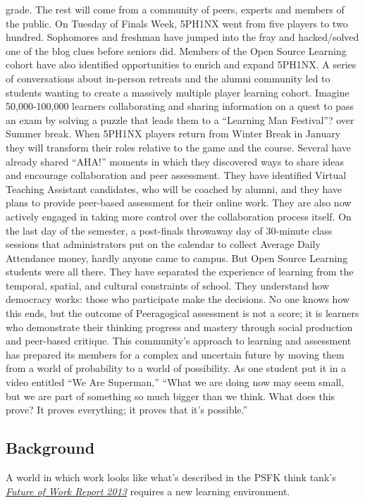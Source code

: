 grade. The rest will come from a community of peers, experts and members
of the public. On Tuesday of Finals Week, 5PH1NX went from five players
to two hundred. Sophomores and freshman have jumped into the fray and
hacked/solved one of the blog clues before seniors did. Members of the
Open Source Learning cohort have also identified opportunities to enrich
and expand 5PH1NX. A series of conversations about in-person retreats
and the alumni community led to students wanting to create a massively
multiple player learning cohort. Imagine 50,000-100,000 learners
collaborating and sharing information on a quest to pass an exam by
solving a puzzle that leads them to a ``Learning Man Festival''? over
Summer break. When 5PH1NX players return from Winter Break in January
they will transform their roles relative to the game and the course.
Several have already shared ``AHA!'' moments in which they discovered
ways to share ideas and encourage collaboration and peer assessment.
They have identified Virtual Teaching Assistant candidates, who will be
coached by alumni, and they have plans to provide peer-based assessment
for their online work. They are also now actively engaged in taking more
control over the collaboration process itself. On the last day of the
semester, a post-finals throwaway day of 30-minute class sessions that
administrators put on the calendar to collect Average Daily Attendance
money, hardly anyone came to campus. But Open Source Learning students
were all there. They have separated the experience of learning from the
temporal, spatial, and cultural constraints of school. They understand
how democracy works: those who participate make the decisions. No one
knows how this ends, but the outcome of Peeragogical assessment is not a
score; it is learners who demonstrate their thinking progress and
mastery through social production and peer-based critique. This
community's approach to learning and assessment has prepared its members
for a complex and uncertain future by moving them from a world of
probability to a world of possibility. As one student put it in a video
entitled ``We Are Superman,'' ``What we are doing now may seem small,
but we are part of something so much bigger than we think. What does
this prove? It proves everything; it proves that it's possible.''

\subsection{Background}

A world in which work looks like what's described in the PSFK think
tank's
\emph{\href{http://www.slideshare.net/PSFK/psfk-presents-future-of-work-report}{Future
of Work Report 2013}} requires a new learning environment.

